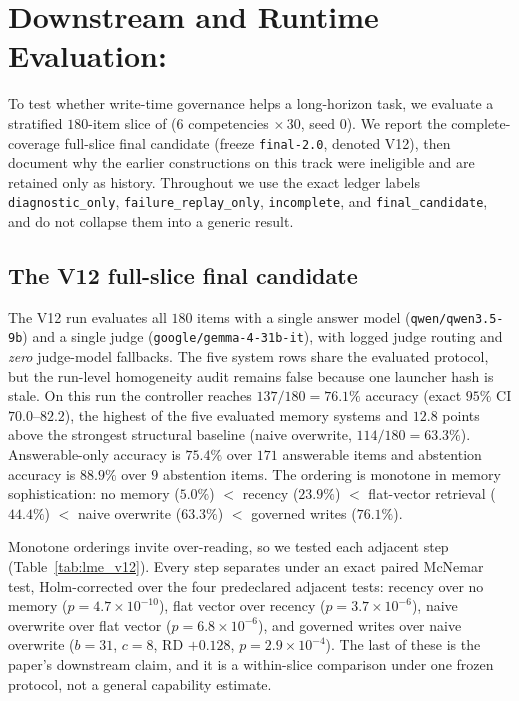 \section{Downstream and Runtime Evaluation: \lme{}}
\label{sec:downstream}

To test whether write-time governance helps a long-horizon task, we evaluate a
stratified $180$-item slice of \lme{} ($6$ competencies $\times\,30$, seed $0$).
We report the complete-coverage full-slice final candidate (freeze
\texttt{final-2.0}, denoted V12), then document why the earlier constructions
on this track were ineligible and are retained only as history. Throughout we
use the exact ledger labels \texttt{diagnostic\_only},
\texttt{failure\_replay\_only}, \texttt{incomplete}, and
\texttt{final\_candidate}, and do not collapse them
into a generic result.

\subsection{The V12 full-slice final candidate}
\label{sec:downstream:final}

The V12 run evaluates all $180$ items with a single answer model
(\texttt{qwen/qwen3.5-9b}) and a single judge (\texttt{google/gemma-4-31b-it}),
with logged judge routing and \emph{zero} judge-model fallbacks. The five system
rows share the evaluated protocol, but the run-level homogeneity audit remains
false because one launcher hash is stale. On this run the
\ask{} controller reaches $137/180 = 76.1\%$ accuracy (exact $95\%$ CI
$70.0$--$82.2$), the highest of the five evaluated memory systems and $12.8$
points above the strongest structural baseline (naive overwrite,
$114/180 = 63.3\%$). Answerable-only accuracy is $75.4\%$ over $171$ answerable
items and abstention accuracy is $88.9\%$ over $9$ abstention items. The
ordering is monotone in memory sophistication: no memory ($5.0\%$) $<$ recency
($23.9\%$) $<$ flat-vector retrieval ($44.4\%$) $<$ naive overwrite ($63.3\%$)
$<$ governed writes ($76.1\%$).

Monotone orderings invite over-reading, so we tested each adjacent step
(Table~\ref{tab:lme_v12}). Every step separates under an exact paired McNemar
test, Holm-corrected over the four predeclared adjacent tests: recency over no memory
($p = 4.7\times10^{-10}$), flat vector over recency ($p = 3.7\times10^{-6}$),
naive overwrite over flat vector ($p = 6.8\times10^{-6}$), and governed writes
over naive overwrite ($b=31$, $c=8$, RD $+0.128$, $p = 2.9\times10^{-4}$). The
last of these is the paper's downstream claim, and it is a within-slice
comparison under one frozen protocol, not a general capability estimate.

